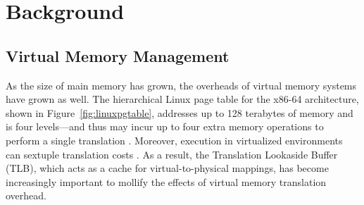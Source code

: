 %
%
%
%
%
%
%
\section{Background}
\subsection{Virtual Memory Management}


As the size of main memory has grown, the overheads of virtual memory systems
have grown as well.  The hierarchical Linux page table for the x86-64
architecture, shown in Figure~\ref{fig:linuxpgtable}, addresses up to 128 terabytes of
memory and is four levels---and thus may incur up to four extra memory
operations to perform a single translation \cite{pgtable}.
Moreover, execution in virtualized environments can sextuple translation costs
\cite{amdnested,intelept,bhargava:2008:atp}.  As a result, the Translation
Lookaside Buffer (TLB), which acts as a cache for virtual-to-physical mappings,
has become increasingly important to mollify the effects of virtual memory
translation overhead.

